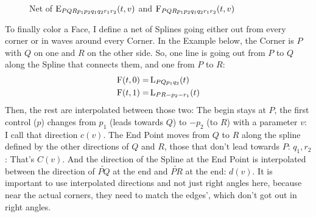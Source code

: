 \begin{figure}
        \caption{Net of $\operatorname{E}_{PQRp_1p_2q_1q_2r_1r_2}(t, v)$ and $\operatorname{F}_{PQRp_1p_2q_1q_2r_1r_2}(t, v)$}
        \label{fig:eta}
    \end{figure}
    To finally color a Face, I define a net of Splines going either out from every corner or in waves around every Corner. In the Example below, the Corner is $P$ with $Q$ on one and $R$ on the other side. So, one line is going out from $P$ to $Q$ along the Spline that connects them, and one from $P$ to $R$:
    $$\begin{aligned}
        \operatorname{F}(t, 0) =& \operatorname{L}_{PQp_1q_2}(t) \\
        \operatorname{F}(t, 1) =& \operatorname{L}_{PR-p_2-r_1}(t) \\
    \end{aligned}$$
    Then, the rest are interpolated between those two: The begin stays at $P$, the first control ($p$) changes from $p_1$ (leads towards $Q$) to $-p_2$ (to $R$) with a parameter $v$: I call that direction $c(v)$. The End Point moves from $Q$ to $R$ along the spline defined by the other directions of $Q$ and $R$, those that don't lead towards $P$: $q_1, r_2$: That's $C(v)$. And the direction of the Spline at the End Point is interpolated between the direction of $\widetilde{PQ}$ at the end and $\widetilde{PR}$ at the end: $d(v)$. It is important to use interpolated directions and not just right angles here, because near the actual corners, they need to match the edges', which don't got out in right angles.
